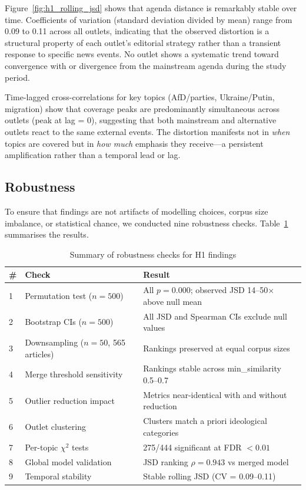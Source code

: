 Figure~\ref{fig:h1_rolling_jsd} shows that agenda distance is remarkably stable over time. Coefficients of variation (standard deviation divided by mean) range from 0.09 to 0.11 across all outlets, indicating that the observed distortion is a structural property of each outlet's editorial strategy rather than a transient response to specific news events. No outlet shows a systematic trend toward convergence with or divergence from the mainstream agenda during the study period.

Time-lagged cross-correlations for key topics (AfD/parties, Ukraine/Putin, migration) show that coverage peaks are predominantly simultaneous across outlets (peak at lag = 0), suggesting that both mainstream and alternative outlets react to the same external events. The distortion manifests not in \textit{when} topics are covered but in \textit{how much} emphasis they receive---a persistent amplification rather than a temporal lead or lag.

\subsection{Robustness}

To ensure that findings are not artifacts of modelling choices, corpus size imbalance, or statistical chance, we conducted nine robustness checks. Table~\ref{tab:robustness} summarises the results.

\begin{table}[H]
\centering
\caption{Summary of robustness checks for H1 findings}
\label{tab:robustness}
\begin{tabular}{llp{7.5cm}}
\hline
\textbf{\#} & \textbf{Check} & \textbf{Result} \\
\hline
1 & Permutation test ($n = 500$) & All $p = 0.000$; observed JSD 14--50$\times$ above null mean \\
2 & Bootstrap CIs ($n = 500$) & All JSD and Spearman CIs exclude null values \\
3 & Downsampling ($n = 50$, 565 articles) & Rankings preserved at equal corpus sizes \\
4 & Merge threshold sensitivity & Rankings stable across min\_similarity 0.5--0.7 \\
5 & Outlier reduction impact & Metrics near-identical with and without reduction \\
6 & Outlet clustering & Clusters match a priori ideological categories \\
7 & Per-topic $\chi^2$ tests & 275/444 significant at FDR $< 0.01$ \\
8 & Global model validation & JSD ranking $\rho = 0.943$ vs merged model \\
9 & Temporal stability & Stable rolling JSD (CV = 0.09--0.11) \\
\hline
\end{tabular}
\end{table}

